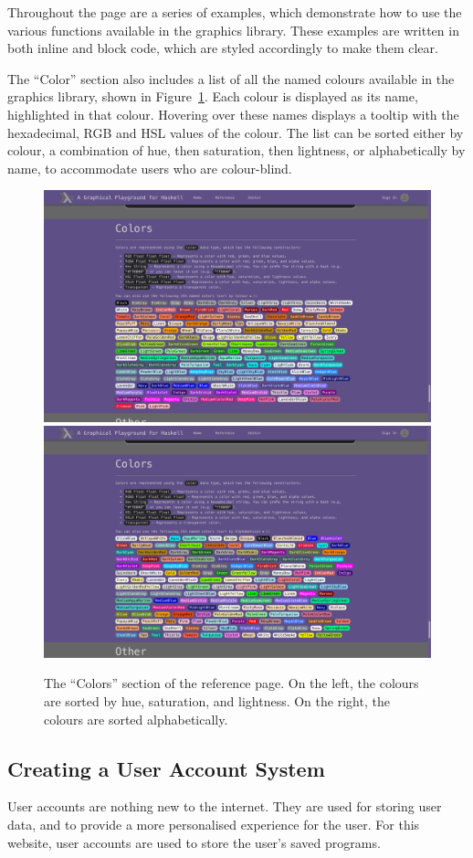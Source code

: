 \documentclass[../main.tex]{subfiles}
\begin{document}
            Throughout the page are a series of examples, which demonstrate how to use the
                various functions available in the graphics library.
            These examples are written in both inline and block code, which are styled
                accordingly to make them clear.

            The ``Color'' section also includes a list of all the named colours available
                in the graphics library, shown in Figure~\ref{fig:colours}.
            Each colour is displayed as its name, highlighted in that colour.
            Hovering over these names displays a tooltip with the hexadecimal, RGB and HSL
                values of the colour.
            The list can be sorted either by colour, a combination of hue, then saturation,
                then lightness, or alphabetically by name, to accommodate users who are
                colour-blind.

            \begin{figure}[H]
                \centering
                \includegraphics[width=0.45\linewidth]{images/colours.png}
                \includegraphics[width=0.45\linewidth]{images/coloursAlphabetical.png}
                    \caption{The ``Colors'' section of the reference page.
                        On the left, the colours are sorted by hue, saturation, and lightness.
                        On the right, the colours are sorted alphabetically.
                    }
                    \label{fig:colours}
            \end{figure}

        \subsection{Creating a User Account System}
            User accounts are nothing new to the internet.
            They are used for storing user data, and to provide a more personalised
                experience for the user.
            For this website, user accounts are used to store the user's saved programs.
\end{document}
